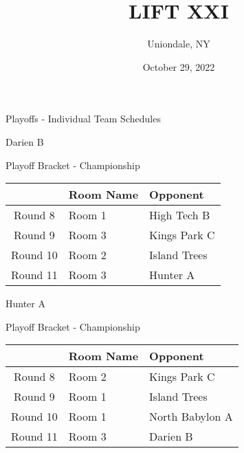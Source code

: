 \documentclass{article}%
\title{LIFT XXI}%
\author{Uniondale, NY}%
\date{October 29, 2022}%
\begin{document}
%
\normalsize%
%
\maketitle%
\vspace*{48pt}%
\begin{center}%
\begin{Huge}%
Playoffs {-} Individual Team Schedules%
\end{Huge}%
\end{center}%
\newpage%
\pagestyle{fancy}%
\fancyhf{}%
%
%
%
\begin{center}%
\begin{Huge}%
Darien B%
\end{Huge}%
\vspace*{12pt}%
\linebreak%
\begin{Large}%
Playoff Bracket {-} Championship%
\end{Large}%
\end{center}%
\vspace*{4pt}%
%
\begin{tabularx}{\textwidth}{|c|Y|Y|}%
\hline%
&Room Name&Opponent\\%
\hline%
Round 8&Room 1&High Tech B\\%
Round 9&Room 3&Kings Park C\\%
Round 10&Room 2&Island Trees\\%
Round 11&Room 3&Hunter A\\%
\hline%
\end{tabularx}%
\vspace*{80pt}%
\linebreak%
\newpage%
\begin{center}%
\begin{Huge}%
Hunter A%
\end{Huge}%
\vspace*{12pt}%
\linebreak%
\begin{Large}%
Playoff Bracket {-} Championship%
\end{Large}%
\end{center}%
\vspace*{4pt}%
%
\begin{tabularx}{\textwidth}{|c|Y|Y|}%
\hline%
&Room Name&Opponent\\%
\hline%
Round 8&Room 2&Kings Park C\\%
Round 9&Room 1&Island Trees\\%
Round 10&Room 1&North Babylon A\\%
Round 11&Room 3&Darien B\\%
\hline%
\end{tabularx}%
\end{document}
